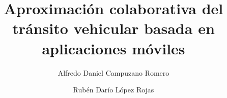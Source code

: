 \documentclass[english,spanish]{fpunathesis}
\begin{document}
\title{Aproximación colaborativa del tránsito vehicular basada en aplicaciones móviles}
\author{Alfredo Daniel Campuzano Romero \and Rubén Darío López Rojas}
\maketitle



\spanishcorrections

\tableofcontents

\listoffigures
\listoftables
\listofalgorithms
\lstlistoflistings

\mainmatter











\end{document}
